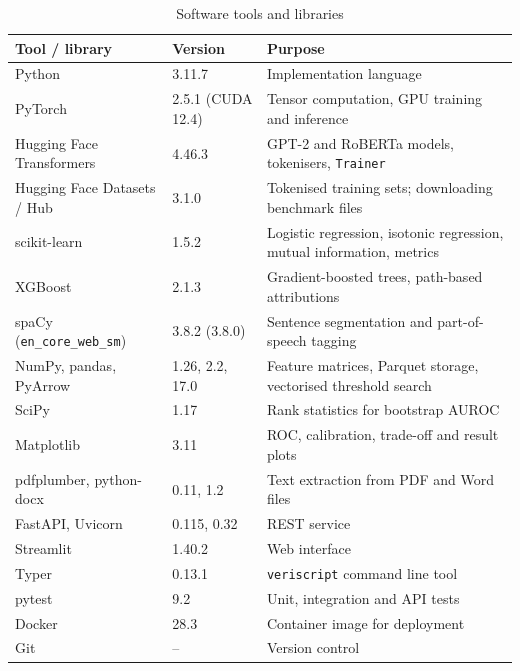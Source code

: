 \begin{table}[H]
\caption{Software tools and libraries}
\label{tab:software}
\centering
\small
\begin{tabularx}{\textwidth}{|p{3.9cm}|p{1.9cm}|L|}
\hline
\textbf{Tool / library} & \textbf{Version} & \textbf{Purpose} \\ \hline
Python & 3.11.7 & Implementation language \\ \hline
PyTorch~\cite{paszke2019pytorch} & 2.5.1 (CUDA 12.4) & Tensor computation, GPU training and inference \\ \hline
Hugging Face Transformers~\cite{wolf2020transformers} & 4.46.3 & GPT-2 and RoBERTa models, tokenisers, \texttt{Trainer} \\ \hline
Hugging Face Datasets / Hub & 3.1.0 & Tokenised training sets; downloading benchmark files \\ \hline
scikit-learn~\cite{pedregosa2011sklearn} & 1.5.2 & Logistic regression, isotonic regression, mutual information, metrics \\ \hline
XGBoost~\cite{chen2016xgboost} & 2.1.3 & Gradient-boosted trees, path-based attributions \\ \hline
spaCy (\texttt{en\_core\_web\_sm}) & 3.8.2 (3.8.0) & Sentence segmentation and part-of-speech tagging \\ \hline
NumPy, pandas, PyArrow & 1.26, 2.2, 17.0 & Feature matrices, Parquet storage, vectorised threshold search \\ \hline
SciPy & 1.17 & Rank statistics for bootstrap AUROC \\ \hline
Matplotlib & 3.11 & ROC, calibration, trade-off and result plots \\ \hline
pdfplumber, python-docx & 0.11, 1.2 & Text extraction from PDF and Word files \\ \hline
FastAPI, Uvicorn & 0.115, 0.32 & REST service \\ \hline
Streamlit & 1.40.2 & Web interface \\ \hline
Typer & 0.13.1 & \texttt{veriscript} command line tool \\ \hline
pytest & 9.2 & Unit, integration and API tests \\ \hline
Docker & 28.3 & Container image for deployment \\ \hline
Git & -- & Version control \\ \hline
\end{tabularx}
\end{table}

